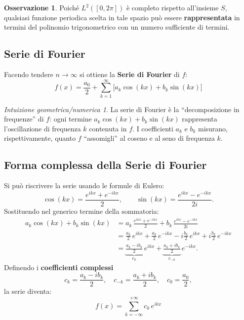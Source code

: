 \documentclass[a4paper,12pt]{article}
\theoremstyle{definition}
\newtheorem{osservazione}{Osservazione}[section]
\theoremstyle{remark}
\newtheorem*{intuizione}{Intuizione geometrica/numerica}
\begin{document}
\begin{osservazione}
Poiché $L^2([0,2\pi])$ è completo rispetto all'insieme $S$, qualsiasi funzione
periodica scelta in tale spazio può essere \textbf{rappresentata} in termini del
polinomio trigonometrico con un numero sufficiente di termini.
\end{osservazione}

\subsection{Serie di Fourier}

Facendo tendere $n \to \infty$ si ottiene la \textbf{Serie di Fourier} di $f$:
\begin{equation}
  \boxed{
    f(x) = \frac{a_0}{2} + \sum_{k=1}^{\infty}\bigl[a_k\cos(kx) + b_k\sin(kx)\bigr]
  }
\end{equation}

\begin{intuizione}
La serie di Fourier è la ``decomposizione in frequenze'' di $f$: ogni termine
$a_k\cos(kx) + b_k\sin(kx)$ rappresenta l'oscillazione di frequenza $k$ contenuta
in $f$. I coefficienti $a_k$ e $b_k$ misurano, rispettivamente, quanto $f$
``assomigli'' al coseno e al seno di frequenza $k$.
\end{intuizione}

\subsection{Forma complessa della Serie di Fourier}

Si può riscrivere la serie usando le formule di Eulero:
\[
  \cos(kx) = \frac{e^{ikx} + e^{-ikx}}{2}, \qquad
  \sin(kx) = \frac{e^{ikx} - e^{-ikx}}{2i}.
\]
Sostituendo nel generico termine della sommatoria:
\begin{align*}
  a_k\cos(kx) + b_k\sin(kx)
    &= a_k\,\frac{e^{ikx}+e^{-ikx}}{2}
       + b_k\,\frac{e^{ikx}-e^{-ikx}}{2i} \\
    &= \frac{a_k}{2}\,e^{ikx}
       + \frac{a_k}{2}\,e^{-ikx}
       - i\frac{b_k}{2}\,e^{ikx}
       + i\frac{b_k}{2}\,e^{-ikx} \\
    &= \underbrace{\frac{a_k - ib_k}{2}}_{c_k}\,e^{ikx}
       + \underbrace{\frac{a_k + ib_k}{2}}_{c_{-k}}\,e^{-ikx}.
\end{align*}
Definendo i \textbf{coefficienti complessi}
\[
  c_k = \frac{a_k - ib_k}{2}, \quad
  c_{-k} = \frac{a_k + ib_k}{2}, \quad
  c_0 = \frac{a_0}{2},
\]
la serie diventa:
\begin{equation}
  \boxed{
    f(x) = \sum_{k=-\infty}^{+\infty} c_k\,e^{ikx}
  }
\end{equation}
\end{document}
